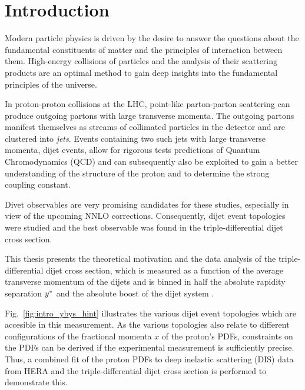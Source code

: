 
\chapter{Introduction}

Modern particle physics is driven by the desire to answer the questions about the
fundamental constituents of matter and the principles of interaction between
them. High-energy collisions of particles and the analysis of their
scattering products are an optimal method to gain deep insights into the
fundamental principles of the universe. 

In proton-proton collisions at the LHC, point-like parton-parton scattering can
produce outgoing partons with large transverse momenta. The outgoing partons
manifest themselves as streams of collimated particles in the detector and are
clustered into \emph{jets}. Events containing two such jets with large
transverse momenta, dijet events, allow for rigorous tests predictions of
Quantum Chromodynamics (QCD) and can subsequently also be exploited to gain a
better understanding of the structure of the proton and to determine the strong
coupling constant.

Divet observables are very promising candidates for these studies, especially in
view of the upcoming NNLO corrections. Consequently, dijet event topologies were
studied and the best observable was found in the triple-differential dijet cross
section.

This thesis presents the theoretical motivation and the data analysis of the
triple-differential dijet cross section, which is measured as a function of the
average transverse momentum of the dijets and is binned in half the absolute
rapidity separation $y^*$ and the absolute boost of the dijet system \yboost.

Fig.~\ref{fig:intro_ybys_hint} illustrates the various dijet event topologies
which are accesible in this measurement. As the various topologies also relate
to different configurations of the fractional momenta $x$ of the proton's PDFs,
constraints on the PDFs can be derived if the experimental measurement is
sufficiently precise. Thus, a combined fit of the proton PDFs to deep inelastic
scattering (DIS) data from HERA and the triple-differential dijet cross section
is performed to demonstrate this.

